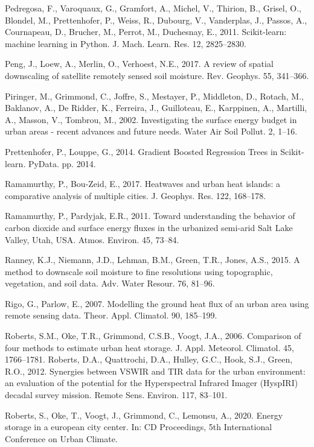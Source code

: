 \documentclass[3p,times]{elsarticle}
\begin{document}
Pedregosa, F., Varoquaux, G., Gramfort, A., Michel, V., Thirion, B., Grisel, O., Blondel, M., Prettenhofer, P., Weiss, R., Dubourg, V., Vanderplas, J., Passos, A., Cournapeau, D., Brucher, M., Perrot, M., Duchesnay, E., 2011. Scikit-learn: machine learning in Python. J. Mach. Learn. Res. 12, 2825–2830.

Peng, J., Loew, A., Merlin, O., Verhoest, N.E., 2017. A review of spatial downscaling of satellite remotely sensed soil moisture. Rev. Geophys. 55, 341–366.

Piringer, M., Grimmond, C., Joffre, S., Mestayer, P., Middleton, D., Rotach, M., Baklanov, A., De Ridder, K., Ferreira, J., Guilloteau, E., Karppinen, A., Martilli, A., Masson, V., Tombrou, M., 2002. Investigating the surface energy budget in urban areas - recent advances and future needs. Water Air Soil Pollut. 2, 1–16.

Prettenhofer, P., Louppe, G., 2014. Gradient Boosted Regression Trees in Scikit-learn. PyData. pp. 2014.

Ramamurthy, P., Bou-Zeid, E., 2017. Heatwaves and urban heat islands: a comparative analysis of multiple cities. J. Geophys. Res. 122, 168–178.

Ramamurthy, P., Pardyjak, E.R., 2011. Toward understanding the behavior of carbon dioxide and surface energy fluxes in the urbanized semi-arid Salt Lake Valley, Utah, USA. Atmos. Environ. 45, 73–84.

Ranney, K.J., Niemann, J.D., Lehman, B.M., Green, T.R., Jones, A.S., 2015. A method to downscale soil moisture to fine resolutions using topographic, vegetation, and soil data. Adv. Water Resour. 76, 81–96.

Rigo, G., Parlow, E., 2007. Modelling the ground heat flux of an urban area using remote sensing data. Theor. Appl. Climatol. 90, 185–199.

Roberts, S.M., Oke, T.R., Grimmond, C.S.B., Voogt, J.A., 2006. Comparison of four methods to estimate urban heat storage. J. Appl. Meteorol. Climatol. 45, 1766–1781. Roberts, D.A., Quattrochi, D.A., Hulley, G.C., Hook, S.J., Green, R.O., 2012. Synergies between VSWIR and TIR data for the urban environment: an evaluation of the potential for the Hyperspectral Infrared Imager (HyspIRI) decadal survey mission. Remote Sens. Environ. 117, 83–101.

Roberts, S., Oke, T., Voogt, J., Grimmond, C., Lemonsu, A., 2020. Energy storage in a european city center. In: CD Proceedings, 5th International Conference on Urban Climate.
\end{document}
